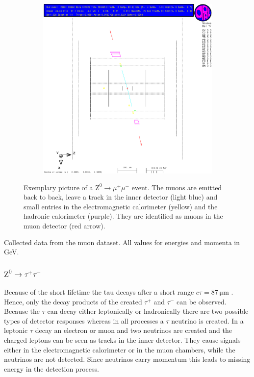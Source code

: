 \documentclass[11pt, a4paper]{article}
\numberwithin{equation}{section}
\begin{document}
\begin{figure}[h]
	\ContinuedFloat
	\begin{subfigure}{\textwidth}
		\centering
		\includegraphics[width=.9\textwidth]{./data/tag1/mm_pics/cropped/mm_02_side}
	\end{subfigure}
	\caption{Exemplary picture of a $\mathrm{Z}^0\rightarrow \mu^+\mu^-$ event. The muons are emitted back to back, leave a track in the inner detector (light blue) and small entries in the electromagnetic calorimeter (yellow) and the hadronic calorimeter (purple). They are identified as muons in the muon detector (red arrow).}
	\label{fig:eventdisplay_mm}
\end{figure}
\begin{table}
	\centering
	
	\caption{Collected data from the muon dataset. All values for energies and momenta in \si{GeV}.}
	\label{tab:eventdisplay_mm}
\end{table}
\clearpage
\subsubsection{$\mathrm{Z}^0\rightarrow \tau^+\tau^-$}

Because of the short lifetime the tau decays after a short range $c \tau = \SI{87}{\micro\meter}$ \cite{pdg}. Hence, only the decay products of the created $\tau^+$ and $\tau^-$ can be observed.
Because the $\tau$ can decay either leptonically or hadronically there are two possible types of detector responses whereas in all processes a $\tau$ neutrino is created.
In a leptonic $\tau$ decay an electron or muon and two neutrinos are created and the charged leptons can be seen as tracks in the inner detector.
They cause signals either in the electromagnetic calorimeter or in the muon chambers, while the neutrinos are not detected.
Since neutrinos carry momentum this leads to missing energy in the detection process.
\end{document}
